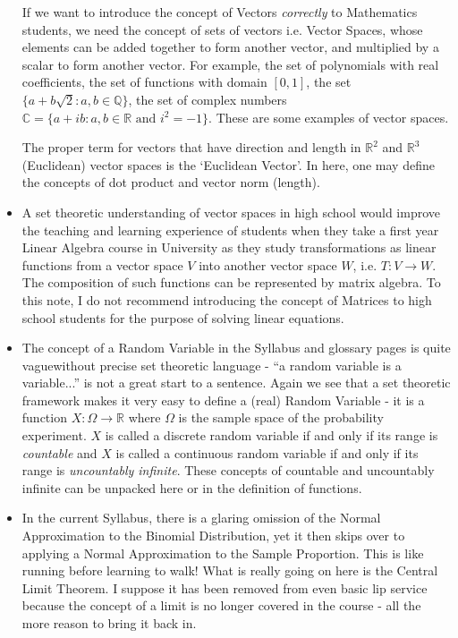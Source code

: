 \documentclass[11pt, a4paper, oneside]{article}
\begin{document}
\begin{itemize}
    If we want to introduce the concept of Vectors \emph{correctly} to Mathematics students, we need the concept of sets of vectors i.e. Vector Spaces, whose elements can be added together to form another vector, and multiplied by a scalar to form another vector. For example, the set of polynomials with real coefficients, the set of functions with domain $[0,1]$, the set $\{ a + b \sqrt{2} : a,b \in \mathbb{Q} \}$, the set of complex numbers $\mathbb{C} = \{ a + ib : a, b \in \mathbb{R} \mbox{ and } i^2 = -1 \}$. These are some examples of vector spaces.

    The proper term for vectors that have direction and length in $\mathbb{R}^2$ and $\mathbb{R}^3$ (Euclidean) vector spaces is the `Euclidean Vector'. In here, one may define the concepts of dot product and vector norm (length).

  \item A set theoretic understanding of vector spaces in high school would improve the teaching and learning experience of students when they take a first year Linear Algebra course in University as they study transformations as linear functions from a vector space $V$ into another vector space $W$, i.e. $T: V \rightarrow W$. The composition of such functions can be represented by matrix algebra. To this note, I do not recommend introducing the concept of Matrices to high school students for the purpose of solving linear equations.

  \item The concept of a Random Variable in the Syllabus and glossary pages is quite vaguewithout precise set theoretic language - ``a random variable is a variable...'' is not a great start to a sentence. Again we see that a set theoretic framework makes it very easy to define a (real) Random Variable - it is a function $X: \Omega \rightarrow \mathbb{R}$ where $\Omega$ is the sample space of the probability experiment. $X$ is called a discrete random variable if and only if its range is \emph{countable} and $X$ is called a continuous random variable if and only if its range is \emph{uncountably infinite}. These concepts of countable and uncountably infinite can be unpacked here or in the definition of functions.

  \item In the current Syllabus, there is a glaring omission of the Normal Approximation to the Binomial Distribution, yet it then skips over to applying a Normal Approximation to the Sample Proportion. This is like running before learning to walk! What is really going on here is the Central Limit Theorem. I suppose it has been removed from even basic lip service because the concept of a limit is no longer covered in the course - all the more reason to bring it back in.


\end{itemize}
\end{document}
